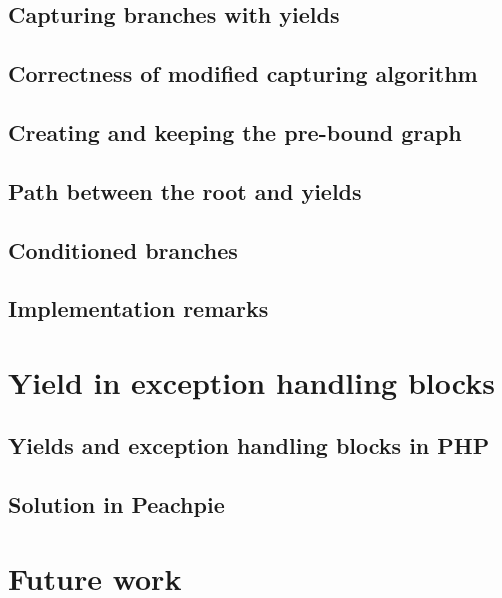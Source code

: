 \subsection{Capturing branches with yields}

\subsection{Correctness of modified capturing algorithm}

\subsection{Creating and keeping the pre-bound graph}

\subsection{Path between the root and yields}

\subsection{Conditioned branches}

\subsection{Implementation remarks}

\section{Yield in exception handling blocks}

\subsection{Yields and exception handling blocks in PHP}

\subsection{Solution in Peachpie}

\section{Future work}